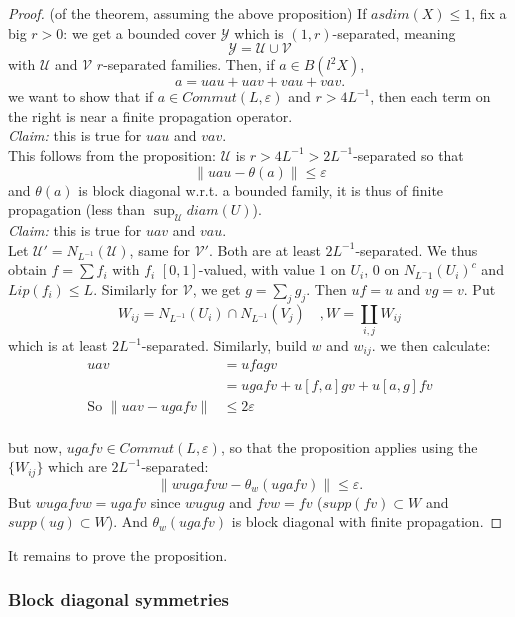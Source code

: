 \begin{proof}(of the theorem, assuming the above proposition)
If $asdim(X)\leq 1$, fix a big $r>0$: we get a bounded cover $\mathcal Y$ which is $(1,r)$-separated, meaning
\[\mathcal Y = \mathcal U \cup \mathcal V\]
with $\mathcal U$ and $\mathcal V$ $r$-separated families. Then, if $a\in B(l^2X)$,
\[a = uau + uav + vau + vav.\]
we want to show that if $a\in Commut (L,\varepsilon)$ and $r>4L^{-1}$, then each term on the right is near a finite propagation operator. \\

\textit{Claim:} this is true for $uau$ and $vav$. \\

This follows from the proposition: $\mathcal U$ is $r>4L^{-1}> 2L^{-1}$-separated so that
\[ \| uau -\theta(a) \| \leq \varepsilon \]
and $\theta(a)$ is block diagonal w.r.t. a bounded family, it is thus of finite propagation (less than $\sup_{\mathcal U} diam (U)$).\\

\textit{Claim:} this is true for $uav$ and $vau$.\\

Let $\mathcal U'=N_{L^{-1}}(\mathcal U)$, same for $\mathcal V'$. Both are at least $2L^{-1}$-separated. We thus obtain $f=\sum f_i$ with $f_i$ $[0,1]$-valued, with value $1$ on $U_i$, $0$ on $N_{L^-1}(U_i)^c$ and $Lip(f_i)\leq L$. Similarly for $\mathcal V$, we get $g=\sum_j g_j$. Then $uf=u$ and $vg=v$. Put 
\[W_{ij} = N_{L^{-1}}(U_i)\cap N_{L^{-1}}(V_j) \quad , W = \coprod_{i,j} W_{ij}\]
which is at least $2L^{-1}$-separated. Similarly, build $w$ and $w_{ij}$. we then calculate:
\[\begin{split} 
uav  &= ufagv \\
	&= ugafv +u [f,a]gv + u [a,g]fv \\
\text{So } \| uav-ugafv \| 	& \leq 2\varepsilon \\
\end{split}\]   

but now, $ugafv \in Commut(L,\varepsilon)$, so that the proposition applies using the $\{W_{ij}\}$ which are $2L^{-1}$-separated:
\[\| wugafvw -\theta_w(ugafv) \| \leq \varepsilon.\]
But $ wugafvw= ugafv$ since $wug ug $ and $fvw = fv $ ($supp (fv)\subset W$ and $supp(ug)\subset W$). And $\theta_w(ugafv)$ is block diagonal with finite propagation.
\end{proof}

It remains to prove the proposition. 

\subsubsection*{Block diagonal symmetries}

